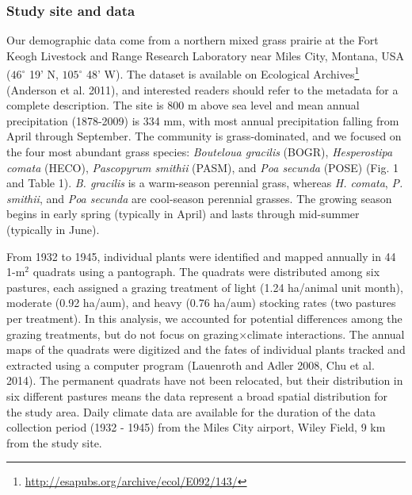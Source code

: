 \documentclass[12pt,]{article}
\let\rmarkdownfootnote\footnote%
\def\footnote{\protect\rmarkdownfootnote}
\begin{document}
\subsubsection{Study site and data}\label{study-site-and-data}

Our demographic data come from a northern mixed grass prairie at the
Fort Keogh Livestock and Range Research Laboratory near Miles City,
Montana, USA (\(46^{\circ}\) 19' N, \(105^{\circ}\) 48' W). The dataset
is available on Ecological Archives\footnote{\url{http://esapubs.org/archive/ecol/E092/143/}}
(Anderson et al. 2011), and interested readers should refer to the
metadata for a complete description. The site is 800 m above sea level
and mean annual precipitation (1878-2009) is 334 mm, with most annual
precipitation falling from April through September. The community is
grass-dominated, and we focused on the four most abundant grass species:
\emph{Bouteloua gracilis} (BOGR), \emph{Hesperostipa comata} (HECO),
\emph{Pascopyrum smithii} (PASM), and \emph{Poa secunda} (POSE) (Fig. 1
and Table 1). \emph{B. gracilis} is a warm-season perennial grass,
whereas \emph{H. comata}, \emph{P. smithii}, and \emph{Poa secunda} are
cool-season perennial grasses. The growing season begins in early spring
(typically in April) and lasts through mid-summer (typically in June).

From 1932 to 1945, individual plants were identified and mapped annually
in 44 1-\(\text{m}^2\) quadrats using a pantograph. The quadrats were
distributed among six pastures, each assigned a grazing treatment of
light (1.24 ha/animal unit month), moderate (0.92 ha/aum), and heavy
(0.76 ha/aum) stocking rates (two pastures per treatment). In this
analysis, we accounted for potential differences among the grazing
treatments, but do not focus on grazing\(\times\)climate interactions.
The annual maps of the quadrats were digitized and the fates of
individual plants tracked and extracted using a computer program
(Lauenroth and Adler 2008, Chu et al. 2014). The permanent quadrats have
not been relocated, but their distribution in six different pastures
means the data represent a broad spatial distribution for the study
area. Daily climate data are available for the duration of the data
collection period (1932 - 1945) from the Miles City airport, Wiley
Field, 9 km from the study site.
\end{document}
